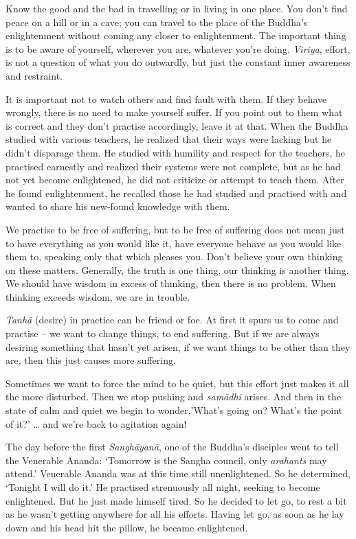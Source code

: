 Know the good and the bad in travelling or in living in one place. You
don't find peace on a hill or in a cave; you can travel to the place of
the Buddha's enlightenment without coming any closer to enlightenment. 
The important thing is to be aware of yourself, wherever you are, 
whatever you're doing. \emph{Viriya}, effort, is not a question of what
you do outwardly, but just the constant inner awareness and restraint. 

It is important not to watch others and find fault with them. If they
behave wrongly, there is no need to make yourself suffer. If you point
out to them what is correct and they don't practise accordingly, leave
it at that. When the Buddha studied with various teachers, he realized
that their ways were lacking but he didn't disparage them. He studied
with humility and respect for the teachers, he practised earnestly and
realized their systems were not complete, but as he had not yet become
enlightened, he did not criticize or attempt to teach them. After he
found enlightenment, he recalled those he had studied and practised with
and wanted to share his new-found knowledge with them. 

We practise to be free of suffering, but to be free of suffering does
not mean just to have everything as you would like it, have everyone
behave as you would like them to, speaking only that which pleases you. 
Don't believe your own thinking on these matters. Generally, the truth
is one thing, our thinking is another thing. We should have wisdom in
excess of thinking, then there is no problem. When thinking exceeds
wisdom, we are in trouble. 

\emph{Tanhā} (desire) in practice can be friend or foe. At first it
spurs us to come and practise -- we want to change things, to end
suffering. But if we are always desiring something that hasn't yet
arisen, if we want things to be other than they are, then this just
causes more suffering. 

Sometimes we want to force the mind to be quiet, but this effort just
makes it all the more disturbed. Then we stop pushing and \emph{samādhi}
arises. And then in the state of calm and quiet we begin to wonder,'What's going on? What's the point of it?' \ldots{} and we're back to
agitation again! 

The day before the first \emph{Sanghāyanā}, one of the Buddha's
disciples went to tell the Venerable Ananda: `Tomorrow is the Sangha
council, only \emph{arahants} may attend.' Venerable Ananda was at this
time still unenlightened. So he determined, `Tonight I will do it.' He
practised strenuously all night, seeking to become enlightened. But he
just made himself tired. So he decided to let go, to rest a bit as he
wasn't getting anywhere for all his efforts. Having let go, as soon as
he lay down and his head hit the pillow, he became enlightened. 

